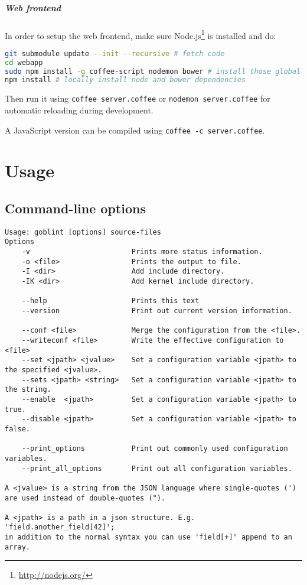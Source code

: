 \paragraph*{Web frontend}
In order to setup the web frontend, make sure Node.js\footnote{\url{http://nodejs.org/}} is installed and do:
\begin{lstlisting}[language=Bash]
git submodule update --init --recursive	# fetch code
cd webapp
sudo npm install -g coffee-script nodemon bower	# install those globally if not already installed (nodemon and bower are optional)
npm install	# locally install node and bower dependencies
\end{lstlisting}
Then run it using \verb|coffee server.coffee| or \verb|nodemon server.coffee| for automatic reloading during development.

A JavaScript version can be compiled using \verb|coffee -c server.coffee|.


\chapter{Usage}
\label{chap:app:usage}
\section{Command-line options}
\begin{lstlisting}
Usage: goblint [options] source-files
Options
    -v                        Prints more status information.                 
    -o <file>                 Prints the output to file.                      
    -I <dir>                  Add include directory.                          
    -IK <dir>                 Add kernel include directory.                   

    --help                    Prints this text                                
    --version                 Print out current version information.          

    --conf <file>             Merge the configuration from the <file>.        
    --writeconf <file>        Write the effective configuration to <file>     
    --set <jpath> <jvalue>    Set a configuration variable <jpath> to the specified <jvalue>.
    --sets <jpath> <string>   Set a configuration variable <jpath> to the string.
    --enable  <jpath>         Set a configuration variable <jpath> to true.   
    --disable <jpath>         Set a configuration variable <jpath> to false.  

    --print_options           Print out commonly used configuration variables.
    --print_all_options       Print out all configuration variables.          

A <jvalue> is a string from the JSON language where single-quotes (') are used instead of double-quotes (").

A <jpath> is a path in a json structure. E.g. 'field.another_field[42]';
in addition to the normal syntax you can use 'field[+]' append to an array.
\end{lstlisting}


